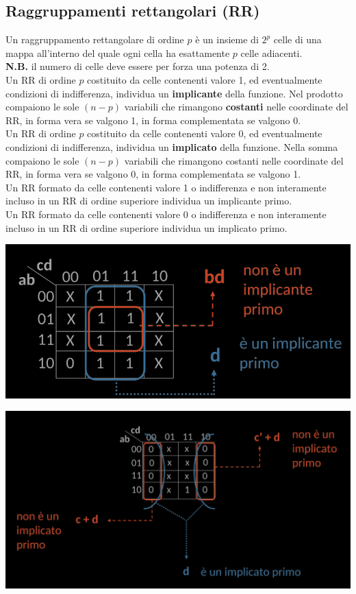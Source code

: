\documentclass{article}
\begin{document}
\subsection{Raggruppamenti rettangolari (RR)}
Un raggruppamento rettangolare di ordine $p$ è un insieme di $2^p$ celle di una mappa all'interno del quale ogni cella ha esattamente $p$ celle adiacenti.\\
\textbf{N.B.} il numero di celle deve essere per forza una potenza di 2.
\vspace{0.3cm}\\
Un RR di ordine $p$ costituito da celle contenenti valore 1, ed eventualmente condizioni di indifferenza, individua un \textbf{implicante} della funzione. Nel prodotto compaiono le sole $(n-p)$ variabili che rimangono \textbf{costanti} nelle coordinate del RR, in forma vera se valgono 1, in forma complementata se valgono 0.
\vspace{0.2cm}\\
Un RR di ordine $p$ costituito da celle contenenti valore 0, ed eventualmente condizioni di indifferenza, individua un \textbf{implicato} della funzione. Nella somma compaiono le sole $(n-p)$ variabili che rimangono costanti nelle coordinate del RR, in forma vera se valgono 0, in forma complementata se valgono 1.
\vspace{0.2cm}\\
Un RR formato da celle contenenti valore 1 o indifferenza e non interamente incluso in un RR di ordine superiore individua un implicante primo.
\vspace{0.2cm}\\
Un RR formato da celle contenenti valore 0 o indifferenza e non interamente incluso in un RR di ordine superiore individua un implicato primo.
\begin{center}
    \includegraphics[scale=0.55]{raggimpl.png}
\end{center}
\begin{center}
    \includegraphics[scale=0.45]{spRR}
\end{center}
\end{document}

